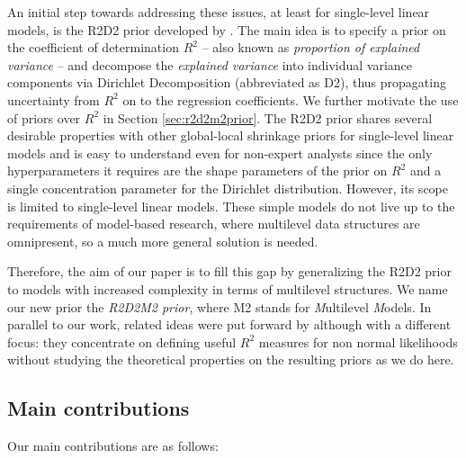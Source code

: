 An initial step towards addressing these issues, at least for single-level linear models, is the R2D2 prior developed by \cite{r2d2zhang}. The main idea is to specify a prior on the coefficient of determination $R^2$ – also known as \textit{proportion of explained variance} – and decompose the \textit{explained variance} into individual variance components via Dirichlet Decomposition (abbreviated as D2), thus propagating uncertainty from $R^2$ on to the regression coefficients. We further motivate the use of priors over $R^2$ in Section \ref{sec:r2d2m2prior}. The R2D2 prior shares several desirable properties with other global-local shrinkage priors for single-level linear models  \citep{PolsonDefault, Horseshoe, r2d2zhang} and is easy to understand even for non-expert analysts since the only hyperparameters it requires are the shape parameters of the prior on $R^2$ and a single concentration parameter for the Dirichlet distribution. However, its scope is limited to single-level linear models. These simple models do not live up to the requirements of model-based research, where multilevel data structures are omnipresent, so a much more general solution is needed.

Therefore, the aim of our paper is to fill this gap by generalizing the R2D2 prior to models with increased complexity in terms of multilevel structures.  We name our new prior the \textit{R2D2M2 prior}, where M2 stands for \emph{M}ultilevel \emph{M}odels.
In parallel to our work, related ideas were put forward by \cite{Yanchenko} although with a different focus: they concentrate on defining useful $R^2$ measures for non normal likelihoods without studying the theoretical properties on the resulting priors as we do here.
\subsection{Main contributions}

Our main contributions are as follows:

